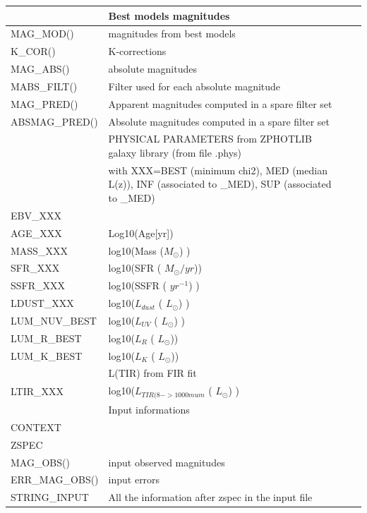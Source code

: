 \documentclass[12pt]{article}
\begin{document}
\begin{tabular}{llll}
\hline
\hline
     &    Best models magnitudes   \\ 
\hline 
MAG\_MOD()           &   magnitudes from best models  \\
K\_COR()                   &  K-corrections   \\
MAG\_ABS()              &  absolute magnitudes \\
MABS\_FILT()            & Filter used for each absolute magnitude \\
MAG\_PRED() & Apparent magnitudes computed in a spare filter set \\
ABSMAG\_PRED()& Absolute magnitudes computed in a spare filter set \\
\hline 
    &   PHYSICAL PARAMETERS  from ZPHOTLIB galaxy library  (from file .phys) \\
    & with XXX=BEST (minimum chi2), MED (median L(z)), INF (associated to \_MED), SUP (associated to \_MED)\\
\hline     
EBV\_XXX               &         \\       
AGE\_XXX               &     Log10(Age[yr])   \\       
MASS\_XXX             &      log10(Mass ($M_{\odot}$)  )  \\       
SFR\_XXX                &     log10(SFR  ( $M_{\odot}/yr$))    \\       
SSFR\_XXX              &      log10(SSFR  ( $yr^{-1}$) )   \\       
LDUST\_XXX           &       log10($L_{dust}$  ( $L_{\odot}$)  )    \\
LUM\_NUV\_BEST     &        log10($L_{UV}$ ( $L_{\odot}$)  )     \\       
LUM\_R\_BEST          &      log10($L_R$ ( $L_{\odot}$))       \\       
LUM\_K\_BEST          &      log10($L_K$ ( $L_{\odot}$))       \\
\hline 
    &   L(TIR) from FIR fit \\
\hline     
LTIR\_XXX               &    log10($L_{TIR (8->1000 mum}$ ( $L_{\odot}$) )    \\       
\hline
   &  Input informations \\
\hline
CONTEXT  &     \\
ZSPEC        &      \\
MAG\_OBS()            &   input observed magnitudes \\
ERR\_MAG\_OBS()  &   input errors   \\
STRING\_INPUT     &    All the information after zspec in the input file      \\
\hline
\hline
\end{tabular}
\end{document}
